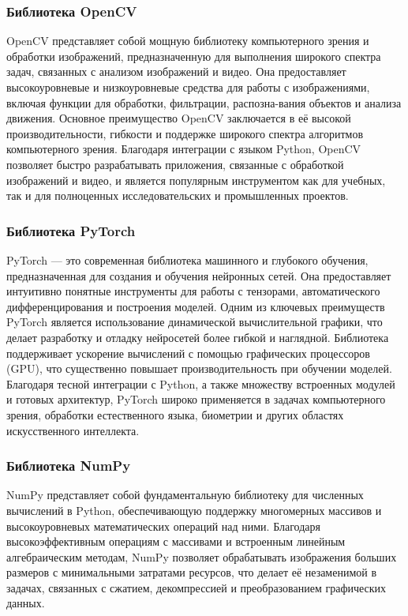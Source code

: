 \subsubsection{Библиотека OpenCV}

OpenCV представляет собой мощную библиотеку компьютерного зрения и обработки изображений, предназначенную для выполнения широкого спектра задач, связанных с анализом изображений и видео. Она предоставляет высокоуровневые и низкоуровневые средства для работы с изображениями, включая функции для обработки, фильтрации, распозна-вания объектов и анализа движения. Основное преимущество OpenCV заключается в её высокой производительности, гибкости и поддержке широкого спектра алгоритмов компьютерного зрения. Благодаря интеграции с языком Python, OpenCV позволяет быстро разрабатывать приложения, связанные с обработкой изображений и видео, и является популярным инструментом как для учебных, так и для полноценных исследовательских и промышленных проектов.

\subsubsection{Библиотека PyTorch}

PyTorch — это современная библиотека машинного и глубокого обучения, предназначенная для создания и обучения нейронных сетей. Она предоставляет интуитивно понятные инструменты для работы с тензорами, автоматического дифференцирования и построения моделей. Одним из ключевых преимуществ PyTorch является использование динамической вычислительной графики, что делает разработку и отладку нейросетей более гибкой и наглядной. Библиотека поддерживает ускорение вычислений с помощью графических процессоров (GPU), что существенно повышает производительность при обучении моделей. Благодаря тесной интеграции с Python, а также множеству встроенных модулей и готовых архитектур, PyTorch широко применяется в задачах компьютерного зрения, обработки естественного языка, биометрии и других областях искусственного интеллекта.

\subsubsection{Библиотека NumPy}

NumPy представляет собой фундаментальную библиотеку для численных вычислений в Python, обеспечивающую поддержку многомерных массивов и высокоуровневых математических операций над ними. Благодаря высокоэффективным операциям с массивами и встроенным линейным алгебраическим методам, NumPy позволяет обрабатывать изображения больших размеров с минимальными затратами ресурсов, что делает её незаменимой в задачах, связанных с сжатием, декомпрессией и преобразованием графических данных.

